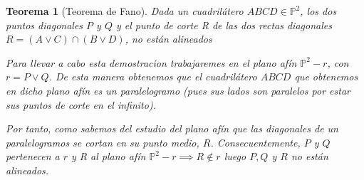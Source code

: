 \documentclass[11pt, a4paper, titlepage]{article}
\makeatletter
\renewenvironment{proof}[1][\proofname] {\vspace{-15pt}\par\pushQED{\qed}\normalfont\topsep6\p@\@plus6\p@\relax\trivlist\item[\hskip\labelsep\it#1\@addpunct{.}]\ignorespaces}{\popQED\endtrivlist\@endpefalse}
\renewenvironment{proof}[1][\proofname] {\par\pushQED{\qed}\normalfont\topsep6\p@\@plus6\p@\relax\trivlist\item[\hskip\labelsep\itshape\sffamily#1\@addpunct{.}]\ignorespaces}{\popQED\endtrivlist\@endpefalse}
\theoremstyle{theorem-style}
\newtheorem{nth}{Teorema}[section]
\theoremstyle{definition-style}
\theoremstyle{remark-style}
\theoremstyle{example-style}
\makeatother
\begin{document}
\begin{nth}[Teorema de Fano]
	Dada un cuadrilátero $ABCD \in \mathbb{P}^2$, los dos puntos diagonales $P$ y $Q$ y el punto de corte R de las dos rectas diagonales $R = (A \vee C)\cap (B\vee D)$, no están alineados 
\\
	
	\begin{proof}
	Para llevar a cabo esta demostracion trabajaremes en el plano afín $\mathbb{P}^2 -r$, con $r = P\vee Q$. De esta manera obtenemos que el cuadrilátero $ABCD$ que obtenemos en dicho plano afín es un paralelogramo (pues sus lados son paralelos por estar sus puntos de corte en el infinito). 
	
	Por tanto, como sabemos del estudio del plano afín que las diagonales de un paralelogramos se cortan en su punto medio, $R$. Consecuentemente, $P$ y $Q$ pertenecen a $r$ y R al plano afín $\mathbb{P}^2 - r \implies R \notin r$ luego $P,Q$ y $R$ no están alineados.  
	\end{proof}
\end{nth}
\end{document}
